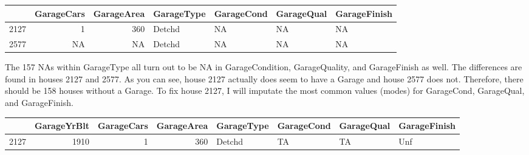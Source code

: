 \documentclass[]{article}
\newenvironment{Shaded}{\begin{snugshade}}{\end{snugshade}}
\newcommand{\CommentTok}[1]{\textcolor[rgb]{0.56,0.35,0.01}{\textit{#1}}}
\newcommand{\DecValTok}[1]{\textcolor[rgb]{0.00,0.00,0.81}{#1}}
\newcommand{\KeywordTok}[1]{\textcolor[rgb]{0.13,0.29,0.53}{\textbf{#1}}}
\newcommand{\NormalTok}[1]{#1}
\newcommand{\OperatorTok}[1]{\textcolor[rgb]{0.81,0.36,0.00}{\textbf{#1}}}
\newcommand{\StringTok}[1]{\textcolor[rgb]{0.31,0.60,0.02}{#1}}
\begin{document}
\begin{longtable}[]{@{}lrrllll@{}}
\toprule
& GarageCars & GarageArea & GarageType & GarageCond & GarageQual &
GarageFinish\tabularnewline
\midrule
\endhead
2127 & 1 & 360 & Detchd & NA & NA & NA\tabularnewline
2577 & NA & NA & Detchd & NA & NA & NA\tabularnewline
\bottomrule
\end{longtable}

The 157 NAs within GarageType all turn out to be NA in GarageCondition,
GarageQuality, and GarageFinish as well. The differences are found in
houses 2127 and 2577. As you can see, house 2127 actually does seem to
have a Garage and house 2577 does not. Therefore, there should be 158
houses without a Garage. To fix house 2127, I will imputate the most
common values (modes) for GarageCond, GarageQual, and GarageFinish.

\begin{Shaded}
\end{Shaded}

\begin{longtable}[]{@{}lrrrllll@{}}
\toprule
& GarageYrBlt & GarageCars & GarageArea & GarageType & GarageCond &
GarageQual & GarageFinish\tabularnewline
\midrule
\endhead
2127 & 1910 & 1 & 360 & Detchd & TA & TA & Unf\tabularnewline
\bottomrule
\end{longtable}
\end{document}
